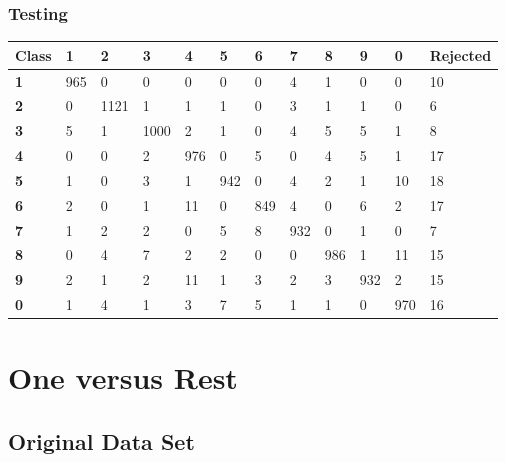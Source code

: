 \documentclass[
  a4paper,            %
  DIV=10,             %
  oneside,            %
  BCOR=5mm,           %
  parskip=half,       %
  numbers=noenddot,   %
  bibtotoc,           %
  listof=totoc,        %
  article
]{scrreprt}
\begin{document}
\subsubsection{Testing}
\begin{center}
  \begin{tabular}{|p{1cm}|p{1cm}|p{1cm}|p{1cm}|p{1cm}|p{1cm}|p{1cm}|p{1cm}|p{1cm}|p{1cm}|p{1cm}|p{1.7cm}|}
    \hline
    \textbf{Class} & \textbf{1} & \textbf{2} & \textbf{3} & \textbf{4} & \textbf{5} & \textbf{6} & \textbf{7} & \textbf{8} & \textbf{9} & \textbf{0} & \textbf{Rejected} \\
    \hline
    \textbf{1} & 965 & 0 & 0 & 0 & 0 & 0 & 4 & 1 & 0 & 0 & 10 \\
    \hline
    \textbf{2} & 0 & 1121 & 1 & 1 & 1 & 0 & 3 & 1 & 1 & 0 & 6 \\
    \hline
    \textbf{3} & 5 & 1 & 1000 & 2 & 1 & 0 & 4 & 5 & 5 & 1 & 8 \\
    \hline
    \textbf{4} & 0 & 0 & 2 & 976 & 0 & 5 & 0 & 4 & 5 & 1 & 17 \\
    \hline
    \textbf{5} & 1 & 0 & 3 & 1 & 942 & 0 & 4 & 2 & 1 & 10 & 18 \\
    \hline
    \textbf{6} & 2 & 0 & 1 & 11 & 0 & 849 & 4 & 0 & 6 & 2 & 17 \\
    \hline
    \textbf{7} & 1 & 2 & 2 & 0 & 5 & 8 & 932 & 0 & 1 & 0 & 7 \\
    \hline
    \textbf{8} & 0 & 4 & 7 & 2 & 2 & 0 & 0 & 986 & 1 & 11 & 15 \\
    \hline
    \textbf{9} & 2 & 1 & 2 & 11 & 1 & 3 & 2 & 3 & 932 & 2 & 15 \\
    \hline
    \textbf{0} & 1 & 4 & 1 & 3 & 7 & 5 & 1 & 1 & 0 & 970 & 16 \\
    \hline
  \end{tabular}
\end{center}
\section{One versus Rest}
\subsection{Original Data Set}
\end{document}

